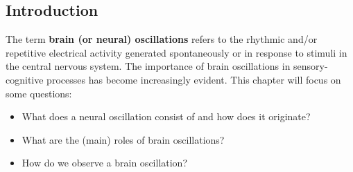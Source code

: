 \subsection{Introduction}
The term \textbf{brain (or neural) oscillations} refers to the rhythmic and/or repetitive
electrical activity generated spontaneously or in response to stimuli in the central nervous
system. The importance of brain oscillations in sensory-cognitive processes has become
increasingly evident. This chapter will focus on some questions:
\begin{itemize}
    \item What does a neural oscillation consist of and how does it originate?
    \item What are the (main) roles of brain oscillations?
    \item How do we observe a brain oscillation?
\end{itemize}

